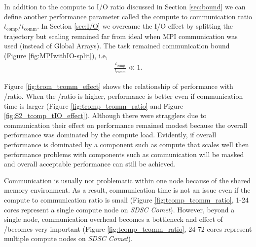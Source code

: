 \label{sec:tcomm}
In addition to the compute to I/O ratio discussed in Section \ref{sec:bound} we can define another performance parameter called the compute to communication ratio $t_{\text{comp}}/t_{\text{comm}}$.
In Section \ref{sec:I/O} we overcame the I/O effect by splitting the trajectory but scaling remained far from ideal when MPI communication was used (instead of  Global Arrays).
The task remained communication bound (Figure \ref{fig:MPIwithIO-split}), i.e, 
\begin{gather*}
  \frac{t_{\text{comp}}}{t_{\text{comm}}} \ll 1.
\end{gather*}

Figure \ref{fig:tcom_tcomm_effect} shows the relationship of performance with \tcomp/\tcomm ratio.
When the \tcomp/\tcomm ratio is higher, performance is better even if communication time is larger (Figure \ref{fig:tcomp_tcomm_ratio} and Figure \ref{fig:S2_tcomp_tIO_effect}).
Although there were stragglers due to communication their effect on performance remained modest because the overall performance was dominated by the compute load. 
Evidently, if overall performance is dominated by a component such as compute that scales well then  performance problems with components such as communication will be masked and overall acceptable performance can still be achieved.

Communication is usually not problematic within one node because of the shared memory environment.
As a result, communication time is not an issue even if the compute to communication ratio is small (Figure \ref{fig:tcomp_tcomm_ratio}, 1-24 cores represent a single compute node on \emph{SDSC Comet}).
However, beyond a single node, communication overhead becomes a bottleneck and effect of \tcomp/\tcomm becomes very important (Figure \ref{fig:tcomp_tcomm_ratio}, 24-72 cores represent multiple compute nodes on \emph{SDSC Comet}).

